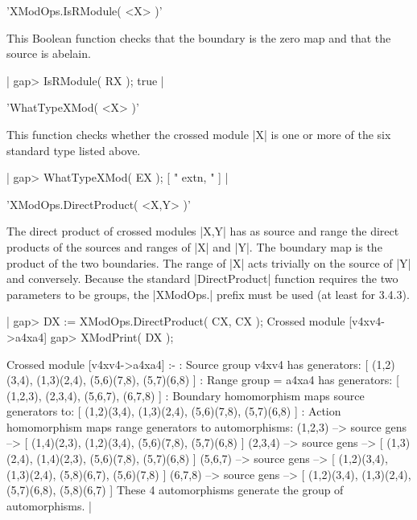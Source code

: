 'XModOps.IsRModule( <X> )'

This Boolean  function checks that  the boundary is  the zero  map and
that the source is abelain.

|    gap> IsRModule( RX );
    true |

%

'WhatTypeXMod( <X> )'

This function checks whether the crossed module  |X| is one or more of
the six standard type listed above.

|    gap> WhatTypeXMod( EX );
    [ " extn, " ]  |

%

'XModOps.DirectProduct( <X,Y> )'

The direct  product of crossed  modules |X,Y| has  as source and range
the direct products  of the sources  and ranges  of |X|  and |Y|.  The
boundary map is the product  of the two  boundaries.  The range of |X|
acts   trivially on the source  of   |Y| and  conversely.  Because the
standard |DirectProduct| function  requires the  two parameters to  be
groups, the |XModOps.| prefix must be used (at least for {\GAP}3.4.3).

|    gap> DX := XModOps.DirectProduct( CX, CX );
    Crossed module [v4xv4->a4xa4]
    gap> XModPrint( DX );

    Crossed module [v4xv4->a4xa4] :- 
    : Source group v4xv4 has generators:
      [ (1,2)(3,4), (1,3)(2,4), (5,6)(7,8), (5,7)(6,8) ]
    : Range group = a4xa4 has generators:
      [ (1,2,3), (2,3,4), (5,6,7), (6,7,8) ]
    : Boundary homomorphism maps source generators to:
      [ (1,2)(3,4), (1,3)(2,4), (5,6)(7,8), (5,7)(6,8) ]
    : Action homomorphism maps range generators to automorphisms:
      (1,2,3) --> { source gens -->
          [ (1,4)(2,3), (1,2)(3,4), (5,6)(7,8), (5,7)(6,8) ] }
      (2,3,4) --> { source gens -->
          [ (1,3)(2,4), (1,4)(2,3), (5,6)(7,8), (5,7)(6,8) ] }
      (5,6,7) --> { source gens -->
          [ (1,2)(3,4), (1,3)(2,4), (5,8)(6,7), (5,6)(7,8) ] }
      (6,7,8) --> { source gens -->
          [ (1,2)(3,4), (1,3)(2,4), (5,7)(6,8), (5,8)(6,7) ] }
      These 4 automorphisms generate the group of automorphisms. |

%


